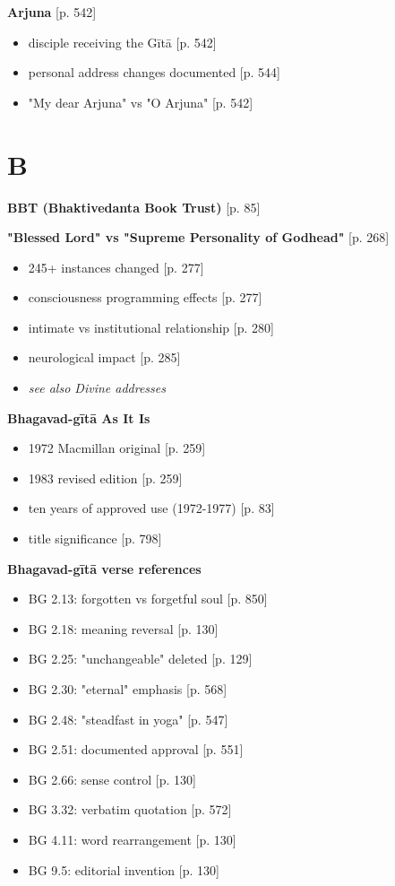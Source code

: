 \documentclass[11pt,twoside]{book}
\begin{document}
\textbf{\textbf{Arjuna}} {[}p. 542]
\begin{itemize}
\item disciple receiving the Gītā [p. 542]
\item personal address changes documented [p. 544]
\item "My dear Arjuna" vs "O Arjuna" [p. 542]
\end{itemize}
\section*{B}
\label{sec:org12df735}

\textbf{\textbf{BBT (Bhaktivedanta Book Trust)}} {[}p. 85]

\textbf{\textbf{"Blessed Lord" vs "Supreme Personality of Godhead"}} {[}p. 268]
\begin{itemize}
\item 245+ instances changed [p. 277]
\item consciousness programming effects [p. 277]
\item intimate vs institutional relationship [p. 280]
\item neurological impact [p. 285]
\item \emph{see also Divine addresses}
\end{itemize}

\textbf{\textbf{Bhagavad-gītā As It Is}}
\begin{itemize}
\item 1972 Macmillan original [p. 259]
\item 1983 revised edition [p. 259]
\item ten years of approved use (1972-1977) [p. 83]
\item title significance [p. 798]
\end{itemize}

\textbf{\textbf{Bhagavad-gītā verse references}}
\begin{itemize}
\item BG 2.13: forgotten vs forgetful soul [p. 850]
\item BG 2.18: meaning reversal [p. 130]
\item BG 2.25: "unchangeable" deleted [p. 129]
\item BG 2.30: "eternal" emphasis [p. 568]
\item BG 2.48: "steadfast in yoga" [p. 547]
\item BG 2.51: documented approval [p. 551]
\item BG 2.66: sense control [p. 130]
\item BG 3.32: verbatim quotation [p. 572]
\item BG 4.11: word rearrangement [p. 130]
\item BG 9.5: editorial invention [p. 130]
\end{itemize}
\end{document}
